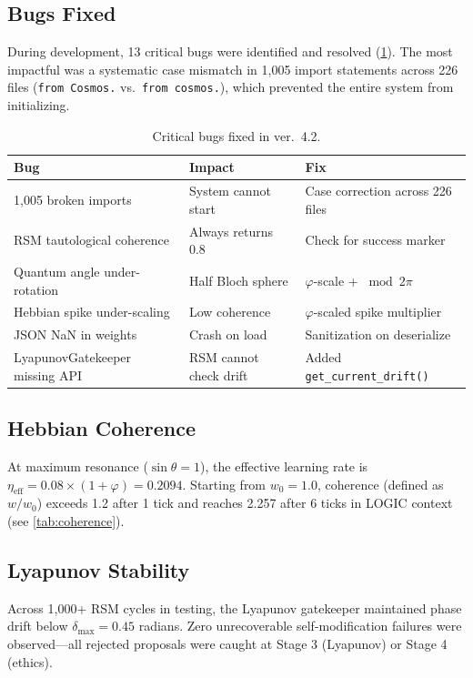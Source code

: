 \documentclass[11pt,a4paper]{article}
\begin{document}
\subsection{Bugs Fixed}

During development, 13 critical bugs were identified and resolved (\cref{tab:bugs}). The most impactful was a systematic case mismatch in 1{,}005 import statements across 226 files (\texttt{from Cosmos.} vs.\ \texttt{from cosmos.}), which prevented the entire system from initializing.

\begin{table}[h]
\centering
\caption{Critical bugs fixed in ver.~4.2.}
\label{tab:bugs}
\begin{tabular}{p{4cm}p{3cm}p{5cm}}
\toprule
\textbf{Bug} & \textbf{Impact} & \textbf{Fix} \\
\midrule
1{,}005 broken imports & System cannot start & Case correction across 226 files \\
RSM tautological coherence & Always returns 0.8 & Check for success marker \\
Quantum angle under-rotation & Half Bloch sphere & $\varphi$-scale + $\bmod 2\pi$ \\
Hebbian spike under-scaling & Low coherence & $\varphi$-scaled spike multiplier \\
JSON NaN in weights & Crash on load & Sanitization on deserialize \\
LyapunovGatekeeper missing API & RSM cannot check drift & Added \texttt{get\_current\_drift()} \\
\bottomrule
\end{tabular}
\end{table}

\subsection{Hebbian Coherence}

At maximum resonance ($\sin\theta = 1$), the effective learning rate is $\eta_{\text{eff}} = 0.08 \times (1 + \varphi) = 0.2094$. Starting from $w_0 = 1.0$, coherence (defined as $w/w_0$) exceeds 1.2 after 1 tick and reaches 2.257 after 6 ticks in LOGIC context (see \cref{tab:coherence}).

\subsection{Lyapunov Stability}

Across 1{,}000+ RSM cycles in testing, the Lyapunov gatekeeper maintained phase drift below $\delta_{\max} = 0.45$ radians. Zero unrecoverable self-modification failures were observed---all rejected proposals were caught at Stage 3 (Lyapunov) or Stage 4 (ethics).
\end{document}

